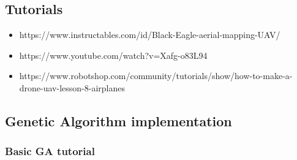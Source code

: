 \documentclass[11pt]{article}
\providecommand{\tightlist}{%
      \setlength{\itemsep}{0pt}\setlength{\parskip}{0pt}}
\begin{document}
    \hypertarget{tutorials}{%
\subsection{Tutorials}\label{tutorials}}

\begin{itemize}
\tightlist
\item
  https://www.instructables.com/id/Black-Eagle-aerial-mapping-UAV/
\item
  https://www.youtube.com/watch?v=Xafg-o83L94
\item
  https://www.robotshop.com/community/tutorials/show/how-to-make-a-drone-uav-lesson-8-airplanes
\end{itemize}

    \hypertarget{genetic-algorithm-implementation}{%
\subsection{Genetic Algorithm
implementation}\label{genetic-algorithm-implementation}}

    \hypertarget{basic-ga-tutorial}{%
\subsubsection{Basic GA tutorial}\label{basic-ga-tutorial}}
\end{document}
